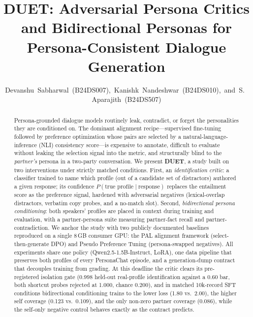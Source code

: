 \documentclass[lettersize,journal]{IEEEtran}
\begin{document}
\title{DUET: Adversarial Persona Critics and Bidirectional Personas for
Persona-Consistent Dialogue Generation}

\author{Devanshu~Sabharwal~(B24DS007),~Kanishk~Nandeshwar~(B24DS010),~and~S.~Aparajith~(B24DS507)}
\maketitle

\begin{abstract}
Persona-grounded dialogue models routinely leak, contradict, or forget the
personalities they are conditioned on. The dominant alignment recipe---supervised
fine-tuning followed by preference optimization whose pairs are selected by a
natural-language-inference (NLI) consistency score---is expensive to annotate,
difficult to evaluate without leaking the selection signal into the metric, and
structurally blind to the \emph{partner's} persona in a two-party conversation.
We present \textbf{DUET}, a study built on two interventions under strictly
matched conditions. First, an \emph{identification critic}: a classifier trained
to name which profile (out of a candidate set of distractors) authored a given
response; its confidence $P(\text{true profile}\mid\text{response})$ replaces the
entailment score as the preference signal, hardened with adversarial negatives
(lexical-overlap distractors, verbatim copy probes, and a no-match slot). Second,
\emph{bidirectional persona conditioning}: both speakers' profiles are placed in
context during training and evaluation, with a partner-persona suite measuring
partner-fact recall and partner-contradiction. We anchor the study with two
publicly documented baselines reproduced on a single 8\,GB consumer GPU: the
PAL alignment framework (select-then-generate DPO) and Pseudo Preference Tuning
(persona-swapped negatives). All experiments share one policy
(Qwen2.5-1.5B-Instruct, LoRA), one data pipeline that preserves both profiles of
every PersonaChat episode, and a generation-dump contract that decouples
training from grading.
At this deadline the critic clears its pre-registered isolation gate
(0.998 held-out real-profile identification against a 0.60 bar, both shortcut
probes rejected at 1.000, chance 0.200), and in matched 10k-record SFT
conditions bidirectional conditioning trains to the lower loss (1.80 vs.\
2.00), the higher self coverage (0.123 vs.\ 0.109), and the only non-zero
partner coverage (0.086), while the self-only negative control behaves exactly
as the contract predicts.
\end{abstract}
\end{document}

